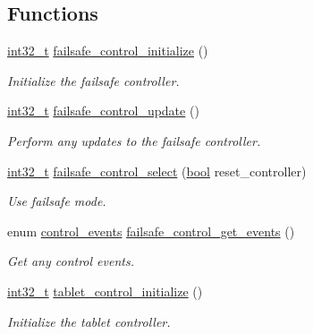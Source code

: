 \subsection*{Functions}
\begin{DoxyCompactItemize}
\item 
\hyperlink{group___n_a_m_e_gafd12020da5a235dfcf0c3c748fb5baed}{int32\-\_\-t} \hyperlink{group___control_ga7ce4be6cb90b629500ec2db534d375f6}{failsafe\-\_\-control\-\_\-initialize} ()
\begin{DoxyCompactList}\small\item\em Initialize the failsafe controller. \end{DoxyCompactList}\item 
\hyperlink{group___n_a_m_e_gafd12020da5a235dfcf0c3c748fb5baed}{int32\-\_\-t} \hyperlink{group___control_gab5211c13a168641b8f8aa3df9c8b26c2}{failsafe\-\_\-control\-\_\-update} ()
\begin{DoxyCompactList}\small\item\em Perform any updates to the failsafe controller. \end{DoxyCompactList}\item 
\hyperlink{group___n_a_m_e_gafd12020da5a235dfcf0c3c748fb5baed}{int32\-\_\-t} \hyperlink{group___control_gad1912458768a13e3fee44acb5992f1d0}{failsafe\-\_\-control\-\_\-select} (\hyperlink{group___exported__types_gaf6a258d8f3ee5206d682d799316314b1}{bool} reset\-\_\-controller)
\begin{DoxyCompactList}\small\item\em Use failsafe mode. \end{DoxyCompactList}\item 
enum \hyperlink{group___control_ga6db279174b366abaad3f5de70b10655c}{control\-\_\-events} \hyperlink{group___control_ga4741ee1f75fdb35137c598e00e3fcbae}{failsafe\-\_\-control\-\_\-get\-\_\-events} ()
\begin{DoxyCompactList}\small\item\em Get any control events. \end{DoxyCompactList}\item 
\hyperlink{group___n_a_m_e_gafd12020da5a235dfcf0c3c748fb5baed}{int32\-\_\-t} \hyperlink{group___control_ga16a2fa9b05e1778d508450239854bdef}{tablet\-\_\-control\-\_\-initialize} ()
\begin{DoxyCompactList}\small\item\em Initialize the tablet controller. \end{DoxyCompactList}\item 

\end{DoxyCompactItemize}
